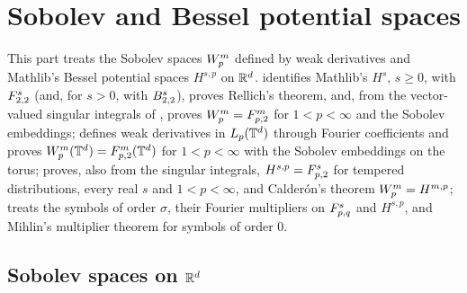 
\part{Sobolev and Bessel potential spaces}
\label{part:sobolev}

This part treats the Sobolev spaces $W^{m}_{p}$ defined by weak derivatives and Mathlib's
Bessel potential spaces $H^{s,p}$ on $\mathbb{R}^d$.  identifies Mathlib's $H^s$,
$s \geq 0$, with $F^{s}_{2,2}$ (and, for $s > 0$, with $B^{s}_{2,2}$), proves Rellich's
theorem, and, from the vector-valued singular integrals of , proves
$W^{m}_{p} = F^{m}_{p,2}$ for $1 < p < \infty$ and the Sobolev embeddings;
 defines weak derivatives in $L_p(\mathbb{T}^d)$ through Fourier coefficients and
proves $W^{m}_{p}(\mathbb{T}^d) = F^{m}_{p,2}(\mathbb{T}^d)$ for $1 < p < \infty$ with the Sobolev
embeddings on the torus;
 proves, also from the singular integrals,
$H^{s,p} = F^{s}_{p,2}$ for tempered distributions, every real $s$ and $1 < p < \infty$, and
Calder\'on's theorem $W^{m}_{p} = H^{m,p}$;
 treats the symbols of order $\sigma$, their Fourier multipliers
on $F^{s}_{p,q}$ and $H^{s,p}$, and Mihlin's multiplier theorem for symbols of order $0$.

\chapter{Sobolev spaces on \texorpdfstring{$\mathbb{R}^d$}{R\^{}d}}
\label{ch:sobolev-rd}

